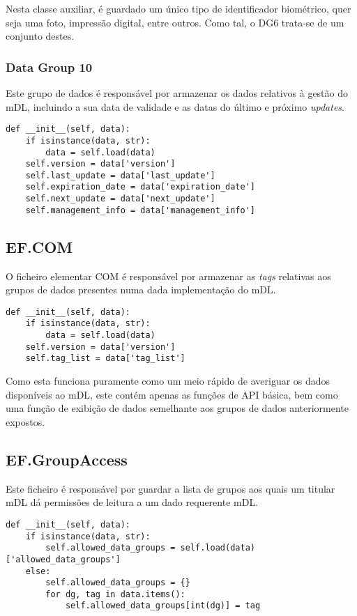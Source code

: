 Nesta classe auxiliar, é guardado um único tipo de identificador biométrico, quer seja uma foto, impressão digital, entre outros. Como tal, o DG6 trata-se de um conjunto destes.

\subsubsection{Data Group 10}

Este grupo de dados é responsável por armazenar os dados relativos à gestão do mDL, incluindo a sua data de validade e as datas do último e próximo \textit{updates}. 

\begin{Verbatim}[frame=single, framerule=0.5mm]
    def __init__(self, data):
    if isinstance(data, str):
        data = self.load(data)
    self.version = data['version']
    self.last_update = data['last_update']
    self.expiration_date = data['expiration_date']
    self.next_update = data['next_update']
    self.management_info = data['management_info']
\end{Verbatim}

\subsection{EF.COM}

O ficheiro elementar COM é responsável por armazenar as \textit{tags} relativas aos grupos de dados presentes numa dada implementação do mDL.

\begin{Verbatim}[frame=single, framerule=0.5mm]
def __init__(self, data):
    if isinstance(data, str):
        data = self.load(data)
    self.version = data['version']
    self.tag_list = data['tag_list']
\end{Verbatim}

Como esta funciona puramente como um meio rápido de averiguar os dados disponíveis ao mDL, este contém apenas as funções de API básica, bem como uma função de exibição de dados semelhante aos grupos de dados anteriormente expostos.


\subsection{EF.GroupAccess}

Este ficheiro é responsável por guardar a lista de grupos aos quais um titular mDL dá permissões de leitura a um dado requerente mDL.

\begin{Verbatim}[frame=single, framerule=0.5mm]
def __init__(self, data):
    if isinstance(data, str):
        self.allowed_data_groups = self.load(data)['allowed_data_groups']
    else:
        self.allowed_data_groups = {}
        for dg, tag in data.items():
            self.allowed_data_groups[int(dg)] = tag
\end{Verbatim}

